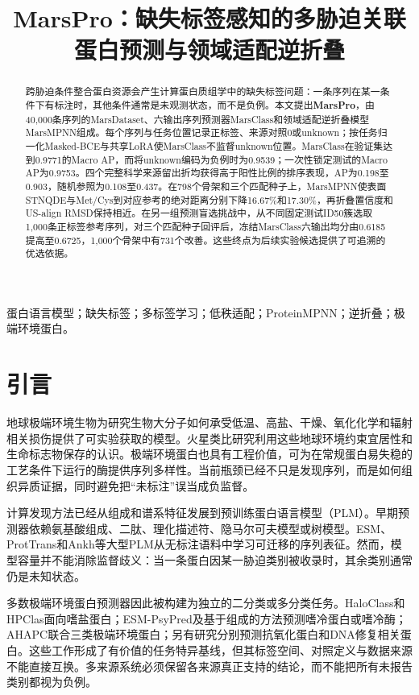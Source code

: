 \documentclass[conference]{IEEEtran}
\title{MarsPro：缺失标签感知的多胁迫关联蛋白预测与领域适配逆折叠}
\author{}
\begin{document}
\maketitle


\begin{abstract}
跨胁迫条件整合蛋白资源会产生计算蛋白质组学中的缺失标签问题：一条序列在某一条件下有标注时，其他条件通常是未观测状态，而不是负例。本文提出\textbf{MarsPro}，由40,000条序列的MarsDataset、六输出序列预测器MarsClass和领域适配逆折叠模型MarsMPNN组成。每个序列与任务位置记录正标签、来源对照0或unknown；按任务归一化Masked-BCE与共享LoRA使MarsClass不监督unknown位置。MarsClass在验证集达到0.9771的Macro AP，而将unknown编码为负例时为0.9539；一次性锁定测试的Macro AP为0.9753。四个完整科学来源留出折均获得高于阳性比例的排序表现，AP为0.198至0.903，随机参照为0.108至0.437。在798个骨架和三个匹配种子上，MarsMPNN使表面STNQDE与Met/Cys到对应参考的绝对距离分别下降16.67\%和17.30\%，再折叠置信度和US-align RMSD保持相近。在另一组预测盲选挑战中，从不同固定测试ID50簇选取1,000条正标签参考序列，对三个匹配种子回评后，冻结MarsClass六输出均分由0.6185提高至0.6725，1,000个骨架中有731个改善。这些终点为后续实验候选提供了可追溯的优选依据。
\end{abstract}
\begin{IEEEkeywords}蛋白语言模型；缺失标签；多标签学习；低秩适配；ProteinMPNN；逆折叠；极端环境蛋白。\end{IEEEkeywords}

\section{引言}\label{sec:intro}

地球极端环境生物为研究生物大分子如何承受低温、高盐、干燥、氧化化学和辐射相关损伤提供了可实验获取的模型。火星类比研究利用这些地球环境约束宜居性和生命标志物保存的认识\cite{ref14,ref15}。极端环境蛋白也具有工程价值，可为在常规蛋白易失稳的工艺条件下运行的酶提供序列多样性\cite{ref31,ref32}。当前瓶颈已经不只是发现序列，而是如何组织异质证据，同时避免把“未标注”误当成负监督。

计算发现方法已经从组成和谱系特征发展到预训练蛋白语言模型（PLM）。早期预测器依赖氨基酸组成、二肽、理化描述符、隐马尔可夫模型或树模型。ESM、ProtTrans和Ankh等大型PLM从无标注语料中学习可迁移的序列表征\cite{ref16,ref2,ref17}。然而，模型容量并不能消除监督歧义：当一条蛋白因某一胁迫类别被收录时，其余类别通常仍是未知状态。

多数极端环境蛋白预测器因此被构建为独立的二分类或多分类任务。HaloClass和HPClas面向嗜盐蛋白\cite{ref1,ref18}；ESM-PsyPred及基于组成的方法预测嗜冷蛋白或嗜冷酶\cite{ref20,ref21}；AHAPC联合三类极端环境蛋白\cite{ref19}；另有研究分别预测抗氧化蛋白和DNA修复相关蛋白\cite{ref22,ref23,ref24}。这些工作形成了有价值的任务特异基线，但其标签空间、对照定义与数据来源不能直接互换。多来源系统必须保留各来源真正支持的结论，而不能把所有未报告类别都视为负例。
\end{document}
